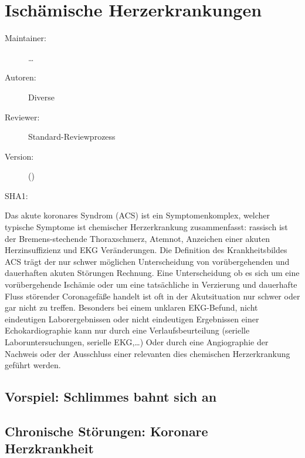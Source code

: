 \def\ChapterCode{FORTBILDUNG}
	\chapter
[\CO{[FORTBILDUNG]} Ischämische Herzerkrankungen]
{Ischämische Herzerkrankungen}
\label{chp:ADVANCED-Atemweg}

\ChapterIntro
{%

}
{%
\begin{description}
  \item[Maintainer:] \ldots
  \item[Autoren:] Diverse
  \item[Reviewer:] Standard-Reviewprozess
  \item[Version:] {\VarDocVersionTypeName} ({\VarDocVersionTypeDescription})
  \item[SHA1:] {\DocGitCommit}
\end{description}

{\TxTeilkapitelAASS}}



\clearpage %


Das akute koronares Syndrom (ACS) ist ein Symptomenkomplex,
welcher typische Symptome ist chemischer Herzerkrankung
zusammenfasst: rassisch ist der Bremens-stechende
Thoraxschmerz, Atemnot, Anzeichen einer akuten
Herzinsuffizienz und EKG Veränderungen. Die Definition des
Krankheitsbildes ACS trägt der nur schwer möglichen
Unterscheidung von vorübergehenden und dauerhaften akuten
Störungen Rechnung. Eine Unterscheidung ob es sich um eine
vorübergehende Ischämie oder um eine tatsächliche in
Verzierung und dauerhafte Fluss störender Coronagefäße
handelt ist oft in der Akutsituation nur schwer oder gar
nicht zu treffen. Besonders bei einem unklaren EKG-Befund,
nicht eindeutigen Laborergebnissen oder nicht eindeutigen
Ergebnissen einer Echokardiographie kann nur durch eine
Verlaufsbeurteilung (serielle Laboruntersuchungen, serielle
EKG,…) Oder durch eine Angiographie der Nachweis oder der
Ausschluss einer relevanten dies chemischen Herzerkrankung
geführt werden.

\section{Vorspiel: Schlimmes bahnt sich an}

\section{Chronische Störungen: Koronare Herzkrankheit}

